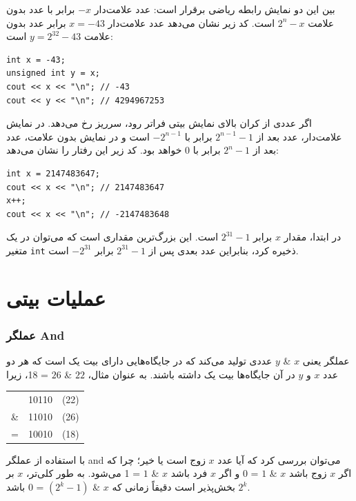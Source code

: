 بین این دو نمایش رابطه ریاضی برقرار است:
عدد علامت‌دار $-x$ برابر با عدد بدون علامت $2^n-x$ است.
کد زیر نشان می‌دهد عدد علامت‌دار $x=-43$ برابر عدد بدون علامت $y=2^{32}-43$ است:
\begin{lstlisting}
int x = -43;
unsigned int y = x;
cout << x << "\n"; // -43
cout << y << "\n"; // 4294967253
\end{lstlisting}

اگر عددی از کران بالای نمایش بیتی فراتر رود، سرریز رخ می‌دهد.
در نمایش علامت‌دار، عدد بعد از $2^{n-1}-1$ برابر با $-2^{n-1}$ است و در نمایش بدون علامت، عدد بعد از $2^n-1$ برابر با $0$ خواهد بود.
کد زیر این رفتار را نشان می‌دهد:
\begin{lstlisting}
int x = 2147483647;
cout << x << "\n"; // 2147483647
x++;
cout << x << "\n"; // -2147483648
\end{lstlisting}

در ابتدا، مقدار $x$ برابر $2^{31}-1$ است.
این بزرگ‌ترین مقداری است که می‌توان در یک متغیر \texttt{int} ذخیره کرد،
بنابراین عدد بعدی پس از $2^{31}-1$ برابر $-2^{31}$ است.


\section{عملیات بیتی}

\newcommand\XOR{\mathbin{\char`\^}}

\subsubsection{عملگر And}


عملگر  یعنی $x$ \& $y$ عددی تولید می‌کند
که در جایگاه‌هایی دارای بیت یک است که هر دو عدد
$x$ و $y$ در آن جایگاه‌ها بیت یک داشته باشند.
به عنوان مثال، $22$ \& $26$ = 18، زیرا

\begin{center}
\begin{tabular}{rrr}
& 10110 & (22)\\
\& & 11010 & (26) \\
\hline
 = & 10010 & (18) \\
\end{tabular}
\end{center}

با استفاده از عملگر and می‌توان بررسی کرد که آیا عدد
$x$ زوج است یا خیر؛ چرا که اگر $x$ زوج باشد
$x$ \& $1$ = 0 و اگر $x$ فرد باشد
$x$ \& $1$ = 1 می‌شود.
به طور کلی‌تر، $x$ بر $2^k$ بخش‌پذیر است
دقیقاً زمانی که $x$ \& $(2^k-1)$ = 0 باشد.

